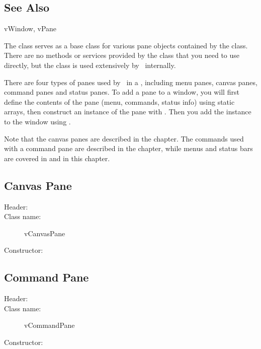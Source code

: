 \subsection* {See Also}

vWindow, vPane



The  class serves as a base class for various pane
objects contained by the  class. There are no
methods or services provided by the  class that
you need to use directly, but the class is used extensively by
\V\ internally.

There are four types of panes used by \V\ in a ,
including menu panes, canvas panes, command panes and status
panes. To add a pane to a window, you will first define the
contents of the pane (menu, commands, status info) using static
arrays, then construct an instance of the pane with . Then you add the instance to the window using
.

Note that the canvas panes are described in the 
chapter. The commands used with a command pane are described
in the  chapter, while menus and status bars
are covered in  and  in this chapter. 

\subsection* {Canvas Pane}
\begin{description}
        \item [Header:] 
        \item [Class name:] vCanvasPane
	\item [Constructor:] 
\end{description}

\subsection* {Command Pane}
\begin{description}
        \item [Header:] 
        \item [Class name:] vCommandPane
	\item [Constructor:] 
\end{description}

